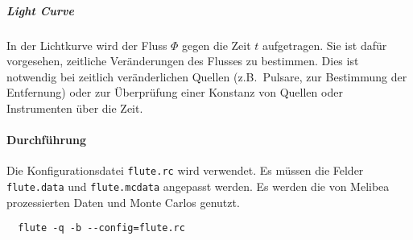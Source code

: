 \subparagraph{Light Curve}
In der Lichtkurve wird
der Fluss $\Phi$ gegen die Zeit $t$
aufgetragen.
Sie ist dafür vorgesehen,
zeitliche Veränderungen des Flusses zu bestimmen.
Dies ist notwendig bei zeitlich veränderlichen Quellen
(z.B.\ Pulsare, zur Bestimmung der Entfernung)
oder zur Überprüfung einer Konstanz von Quellen oder Instrumenten
über die Zeit.



\paragraph{Durchführung}%

Die Konfigurationsdatei \texttt{flute.rc} wird verwendet.
Es müssen die Felder \texttt{flute.data} und \texttt{flute.mcdata} angepasst werden.
Es werden die von Melibea prozessierten Daten und Monte Carlos genutzt.


\begin{lstlisting}
  flute -q -b --config=flute.rc
\end{lstlisting}
